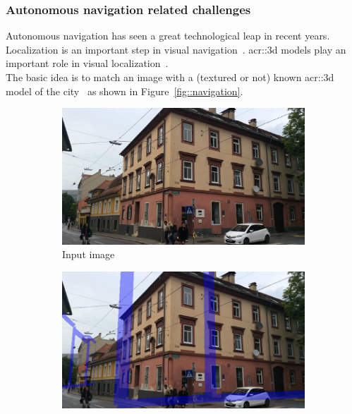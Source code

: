         \subsubsection{Autonomous navigation related challenges}
            Autonomous navigation has seen a great technological leap in recent years.
            Localization is an important step in visual navigation~\parencite{bonin2008visual}.
            \Gls{acr::3d} models play an important role in visual localization~\parencite{piasco2018survey, ijgi4042842}.\\
            The basic idea is to match an image with a (textured or not) known \gls{acr::3d} model of the city~\parencite{arth2015instant, ardeshir2014gis, cham2010estimating, christie2016semantics} as shown in Figure~\ref{fig::navigation}.
            \begin{figure}[htpb]
                \begin{subfigure}{.18\textwidth}
                    \begin{center}
                        \includegraphics[width=\textwidth]{images/introduction/3d_model_applications/pose_estimation/input_image}
                        \caption{\label{subfig::input_image} Input image}
                    \end{center}
                \end{subfigure}
                \hfill
                \begin{subfigure}{.18\textwidth}
                    \begin{center}
                        \includegraphics[width=\textwidth]{images/introduction/3d_model_applications/pose_estimation/init_pose}

\end{center}
\end{subfigure}
\end{figure}
